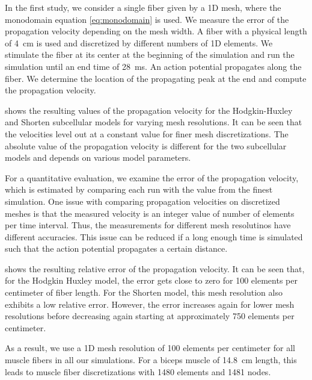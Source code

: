 In the first study, we consider a single fiber given by a 1D mesh, where the monodomain equation \cref{eq:monodomain} is used.
We measure the error of the propagation velocity depending on the mesh width. A fiber with a physical length of \SI{4}{\cm} is used and discretized by different numbers of 1D elements. We stimulate the fiber at its center at the beginning of the simulation and run the simulation until an end time of \SI{28}{\ms}. An action potential propagates along the fiber. We determine the location of the propagating peak at the end and compute the propagation velocity.

 shows the resulting values of the propagation velocity for the Hodgkin-Huxley and Shorten subcellular models for varying mesh resolutions. It can be seen that the velocities level out at a constant value for finer mesh discretizations. The absolute value of the propagation velocity is different for the two subcellular models and depends on various model parameters.

For a quantitative evaluation, we examine the error of the propagation velocity, which is estimated by comparing each run with the value from the finest simulation. 
One issue with comparing propagation velocities on discretized meshes is that the measured velocity is an integer value of number of elements per time interval. Thus, the measurements for different mesh resolutinos have different accuracies. This issue can be reduced if a long enough time is simulated such that the action potential propagates a certain distance.

 shows the resulting relative error of the propagation velocity. It can be seen that, for the Hodgkin Huxley model, the error gets close to zero for 100 elements per centimeter of fiber length. For the Shorten model, this mesh resolution also exhibits a low relative error. However, the error increases again for lower mesh resolutions before decreasing again starting at approximately 750 elements per centimeter. 

As a result, we use a 1D mesh resolution of 100 elements per centimeter for all muscle fibers in all our simulations. For a biceps muscle of \SI{14.8}{\cm} length, this leads to muscle fiber discretizations with 1480 elements and 1481 nodes.


